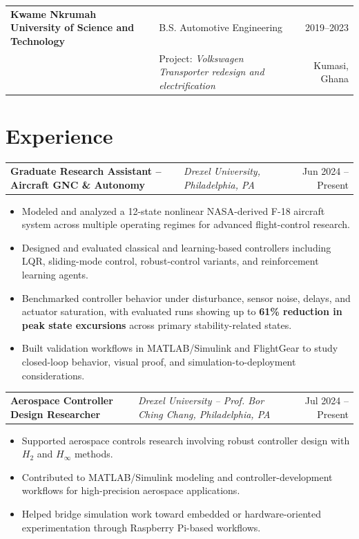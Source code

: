 \documentclass[10pt,letterpaper]{article}
\makeatletter
\newenvironment{role}[4]
{
\begin{tabularx}{\textwidth}{@{}l Y r@{}}
\textbf{#1} & \textit{#2, #3} & #4
\end{tabularx}
\vspace{-0.45em}
\begin{itemize}[leftmargin=1.15em, itemsep=0.14em, topsep=0.15em]
}
{
\end{itemize}
\vspace{0.05em}
}
\makeatother
\begin{document}
\vspace{0.2em}

\begin{tabularx}{\textwidth}{@{}l Y r@{}}
\textbf{Kwame Nkrumah University of Science and Technology} & B.S. Automotive Engineering & 2019--2023 \\
& Project: \textit{Volkswagen Transporter redesign and electrification} & Kumasi, Ghana
\end{tabularx}

\section{Experience}

\begin{role}
{Graduate Research Assistant -- Aircraft GNC \& Autonomy}
{Drexel University}
{Philadelphia, PA}
{Jun 2024 -- Present}
    \item Modeled and analyzed a 12-state nonlinear NASA-derived F-18 aircraft system across multiple operating regimes for advanced flight-control research.
    \item Designed and evaluated classical and learning-based controllers including LQR, sliding-mode control, robust-control variants, and reinforcement learning agents.
    \item Benchmarked controller behavior under disturbance, sensor noise, delays, and actuator saturation, with evaluated runs showing up to \textbf{61\% reduction in peak state excursions} across primary stability-related states.
    \item Built validation workflows in MATLAB/Simulink and FlightGear to study closed-loop behavior, visual proof, and simulation-to-deployment considerations.
\end{role}

\begin{role}
{Aerospace Controller Design Researcher}
{Drexel University -- Prof. Bor Ching Chang}
{Philadelphia, PA}
{Jul 2024 -- Present}
    \item Supported aerospace controls research involving robust controller design with $H_2$ and $H_\infty$ methods.
    \item Contributed to MATLAB/Simulink modeling and controller-development workflows for high-precision aerospace applications.
    \item Helped bridge simulation work toward embedded or hardware-oriented experimentation through Raspberry Pi-based workflows.
\end{role}
\end{document}
